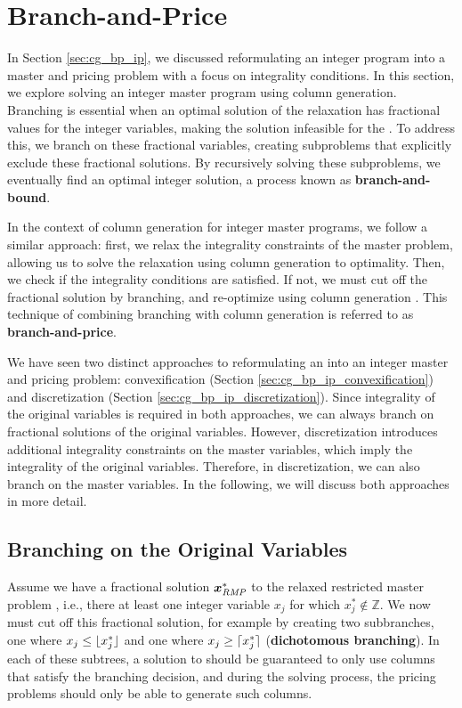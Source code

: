 \section{Branch-and-Price}\label{sec:cg_bp_bp}
In Section \ref{sec:cg_bp_ip}, we discussed reformulating an integer program into a master and pricing problem with a focus on integrality conditions. In this section, we explore solving an integer master program using column generation. Branching is essential when an optimal solution of the \LP{} relaxation has fractional values for the integer variables, making the solution infeasible for the \IP{}. To address this, we branch on these fractional variables, creating subproblems that explicitly exclude these fractional solutions. By recursively solving these subproblems, we eventually find an optimal integer solution, a process known as \textbf{branch-and-bound}.

In the context of column generation for integer master programs, we follow a similar approach: first, we relax the integrality constraints of the master problem, allowing us to solve the relaxation using column generation to optimality. Then, we check if the integrality conditions are satisfied. If not, we must cut off the fractional solution by branching, and re-optimize using column generation \cite{thebook}. This technique of combining branching with column generation is referred to as \textbf{branch-and-price}.

We have seen two distinct approaches to reformulating an \IP{} into an integer master and pricing problem: convexification (Section \ref{sec:cg_bp_ip_convexification}) and discretization (Section \ref{sec:cg_bp_ip_discretization}). Since integrality of the original variables is required in both approaches, we can always branch on fractional solutions of the original variables. However, discretization introduces additional integrality constraints on the master variables, which imply the integrality of the original variables. Therefore, in discretization, we can also branch on the master variables. In the following, we will discuss both approaches in more detail.

\subsection{Branching on the Original Variables}\label{sec:cg_bp_bp_branching_original}
Assume we have a fractional solution ${\bm{x}}^*_{\textit{RMP}}{}$ to the relaxed restricted master problem \RMP{}, i.e., there at least one integer variable $x_j$ for which $x_j^* \not\in \mathbb{Z}$. We now must cut off this fractional solution, for example by creating two subbranches, one where $x_j \leq \lfloor x_j^*\rfloor$ and one where $x_j \geq \lceil x_j^*\rceil$ (\textbf{dichotomous branching}). In each of these subtrees, a solution to \RMP{} should be guaranteed to only use columns that satisfy the branching decision, and during the solving process, the pricing problems should only be able to generate such columns.

